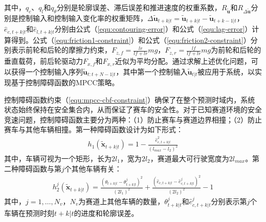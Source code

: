 其中，$q_c$、$q_l$和$q_{\theta}$分别是轮廓误差、滞后误差和推进速度的权重系数，$R_{\tilde{\boldsymbol{u}}}$和$R_{\Delta \tilde{\boldsymbol{u}}}$分别是控制输入和控制输入变化率的权重矩阵，$\Delta\tilde{\boldsymbol{u}}_{t+k|t} = \tilde{\boldsymbol{u}}_{t+k|t} - \tilde{\boldsymbol{u}}_{t+k-1|t}$，$\hat{e}_{c,t+k|t}$和$\hat{e}_{l,t+k|t}$分别由公式（\ref{equ:contouring-error}）和公式（\ref{equ:lag-error}）计算得到。公式（\ref{equ:friction1-constraint}）和公式（\ref{equ:friction2-constraint}）分别表示前轮和后轮的摩擦力约束，$F_{z,f}=\frac{lr}{lf+lr}mg$，$F_{z,r}=\frac{lf}{lf+lr}mg$为前轮和后轮的垂直载荷，前后轮驱动力$F_{x,f}$和$F_{x,r}$近似为平均分配。通过求解上述优化问题，可以获得一个控制输入序列$\tilde{\boldsymbol{u}}_{t:t+N-1|t}$，其中第一个控制输入$\tilde{\boldsymbol{u}}_{t|t}$被应用于系统，以实现基于控制障碍函数的MPCC策略。

控制障碍函数约束（\ref{equ:mpcc-cbf-constraint}）确保了在整个预测时域内，系统状态始终保持在安全集合内，从而保证了赛车的安全性。对于已知赛道环境的安全竞速问题，控制障碍函数主要分为两种：（1）防止赛车与赛道边界相撞；（2）防止赛车与其他车辆相撞。第一种障碍函数设计为如下形式：
\begin{equation}
\begin{aligned}
    h_1(\tilde{\boldsymbol{x}}_{t+k|t})=1-\frac{\hat{e}_{c,t+k|t}^2}{(l_{max}-l_2)^2}
\end{aligned}
\end{equation}
其中，车辆可视为一个矩形，长为$2l_1$，宽为$2l_2$，赛道最大可行驶宽度为$2 l_{max}$。第二种障碍函数与第$j$个其他车辆有关：
\begin{equation}
\begin{aligned}
h_2^j(\tilde{\boldsymbol{x}}_{t+k|t})=\frac{(\theta_{t+k|t}-\theta^j_{t+k|t})^2}{(2l_1)^2}+\frac{(\hat{e}_{c,t+k|t}-\hat{e}_{c,t+k|t}^j)^2}{(2l_2)^2}-1
\end{aligned}
\end{equation}
其中，$j=1,\ldots,N_v$，$N_v$为赛道上其他车辆的数量，$\theta^j_{t+k|t}$和$\hat{e}_{c,t+k|t}^j$分别表示第$j$个车辆在预测时刻$t+k|t$的进度和轮廓误差。
\newpage
